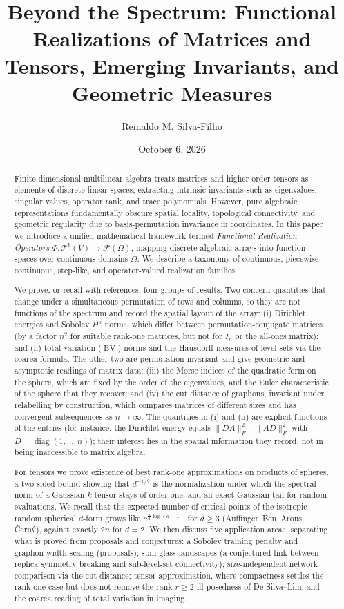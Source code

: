 \documentclass[11pt,a4paper,reqno]{amsart}
\title[Beyond the Spectrum]{Beyond the Spectrum: Functional Realizations of Matrices and Tensors, Emerging Invariants, and Geometric Measures}
\author{Reinaldo M. Silva-Filho}
\date{October 6, 2026}
\theoremstyle{definition}
\numberwithin{equation}{section}
\newcommand{\BV}{\operatorname{BV}}
\begin{document}
\begin{abstract}
Finite-dimensional multilinear algebra treats matrices and higher-order tensors as elements of discrete linear spaces, extracting intrinsic invariants such as eigenvalues, singular values, operator rank, and trace polynomials. However, pure algebraic representations fundamentally obscure spatial locality, topological connectivity, and geometric regularity due to basis-permutation invariance in coordinates. In this paper we introduce a unified mathematical framework termed \emph{Functional Realization Operators} $\Phi \colon \mathcal{T}^k(V) \to \mathcal{F}(\Omega)$, mapping discrete algebraic arrays into function spaces over continuous domains $\Omega$. We describe a taxonomy of continuous, piecewise continuous, step-like, and operator-valued realization families.

We prove, or recall with references, four groups of results. Two concern quantities that change under a simultaneous permutation of rows and columns, so they are not functions of the spectrum and record the spatial layout of the array: (i) Dirichlet energies and Sobolev $H^s$ norms, which differ between permutation-conjugate matrices (by a factor $n^2$ for suitable rank-one matrices, but not for $I_n$ or the all-ones matrix); and (ii) total variation ($\BV$) norms and the Hausdorff measures of level sets via the coarea formula. The other two are permutation-invariant and give geometric and asymptotic readings of matrix data: (iii) the Morse indices of the quadratic form on the sphere, which are fixed by the order of the eigenvalues, and the Euler characteristic of the sphere that they recover; and (iv) the cut distance of graphons, invariant under relabelling by construction, which compares matrices of different sizes and has convergent subsequences as $n \to \infty$. The quantities in (i) and (ii) are explicit functions of the entries (for instance, the Dirichlet energy equals $\|DA\|_F^2 + \|AD\|_F^2$ with $D = \operatorname{diag}(1, \dots, n)$); their interest lies in the spatial information they record, not in being inaccessible to matrix algebra.

For tensors we prove existence of best rank-one approximations on products of spheres, a two-sided bound showing that $d^{-1/2}$ is the normalization under which the spectral norm of a Gaussian $k$-tensor stays of order one, and an exact Gaussian tail for random evaluations. We recall that the expected number of critical points of the isotropic random spherical $d$-form grows like $e^{\frac{n}{2}\log(d-1)}$ for $d \ge 3$ (Auffinger--Ben~Arous--\v{C}ern\'y), against exactly $2n$ for $d = 2$. We then discuss five application areas, separating what is proved from proposals and conjectures: a Sobolev training penalty and graphon width scaling (proposals); spin-glass landscapes (a conjectured link between replica symmetry breaking and sub-level-set connectivity); size-independent network comparison via the cut distance; tensor approximation, where compactness settles the rank-one case but does not remove the rank-$r \ge 2$ ill-posedness of De Silva--Lim; and the coarea reading of total variation in imaging.
\end{abstract}
\end{document}
